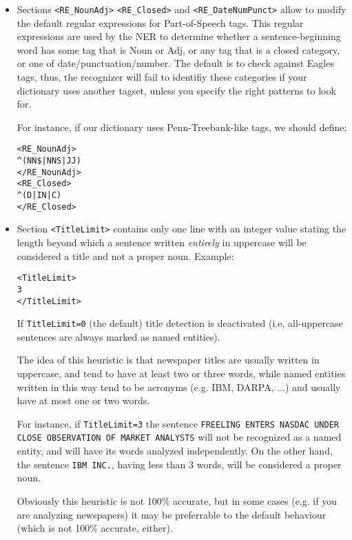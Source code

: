 \documentclass[a4paper]{book}
\begin{document}
\begin{itemize}
  \item Sections \verb#<RE_NounAdj># \verb#<RE_Closed># and
    \verb#<RE_DateNumPunct># allow to modify the default regular
    expressions for Part-of-Speech tags. This regular expressions are
    used by the NER to determine whether a sentence-beginning word has
    some tag that is Noun or Adj, or any tag that is a closed
    category, or one of date/punctuation/number. The default is to
    check against Eagles tags, thus, the recognizer will fail to
    identifiy these categories if your dictionary uses another tagset,
    unless you specify the right patterns to look for.

  For instance, if our dictionary uses Penn-Treebank-like tags, we
  should define:
\begin{verbatim}
<RE_NounAdj>
^(NN$|NNS|JJ)
</RE_NounAdj>
<RE_Closed>
^(D|IN|C)
</RE_Closed>
\end{verbatim}
  
  \item Section \verb#<TitleLimit># contains only one line with an integer
  value stating the length beyond which a sentence written {\sl
  entirely} in uppercase will be considered a title and not a proper
  noun. Example:
\begin{verbatim}
<TitleLimit>
3
</TitleLimit>
\end{verbatim}

  If \verb#TitleLimit=0# (the default) title detection is
  deactivated (i.e, all-uppercase sentences are always marked as
  named entities).

  The idea of this heuristic is that newspaper titles are usually
  written in uppercase, and tend to have at least two or three
  words, while named entities written in this way tend to be acronyms
  (e.g. IBM, DARPA, ...) and usually have at most one or two words.

  For instance, if \verb#TitleLimit=3# the sentence 
  {\tt FREELING ENTERS NASDAC UNDER CLOSE OB\-SER\-VA\-TION OF MARKET ANALYSTS}
  will not be recognized as a named entity, and will have its words analyzed
  independently. On the other hand, the sentence {\tt IBM INC.}, having less than
  3 words, will be considered a proper noun.

  Obviously this heuristic is not 100\% accurate, but in some cases
  (e.g. if you are analyzing newspapers) it may be preferrable to the
  default behaviour (which is not 100\% accurate, either).
  

\end{itemize}
\end{document}

